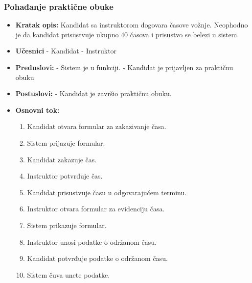 \subsubsection{Pohađanje praktične obuke}

\vspace{3mm}

\begin{itemize}

\item \textbf{Kratak opis:} Kandidat sa instruktorom dogovara časove vožnje. Neophodno je da kandidat prisustvuje ukupno 40 časova i prisustvo se belezi u sistem.

\vspace{2mm}

\item \textbf{Učesnici} \newline
   - Kandidat \newline   
   - Instruktor 
   
\item \textbf{Preduslovi:} \newline
   - Sistem je u funkciji. \newline
   - Kandidat je prijavljen za praktičnu obuku 

\item \textbf{Postuslovi:} \newline
    - Kandidat je završio praktičnu obuku.

\item \textbf{Osnovni tok:}  
   \begin{enumerate}
   \item Kandidat otvara formular za zakazivanje časa.
   \item Sistem prijazuje formular.
   \item Kandidat zakazuje čas.
   \item Instruktor potvrđuje čas.
   \item Kandidat prisustvuje času u odgovarajućem terminu.
   \item Instruktor otvara formular za evidenciju časa.
   \item Sistem prikazuje formular.
   \item Instruktor unosi podatke o održanom času.
   \item Kandidat potvrđuje podatke o održanom času.
   \item Sistem čuva unete podatke. \newline
   \end{enumerate}


\end{itemize}
